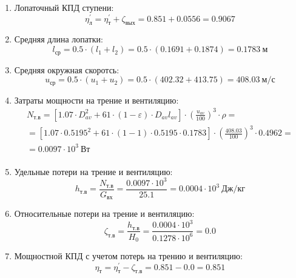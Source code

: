 \documentclass[a4paper,10pt]{article}
\begin{document}
\begin{enumerate}
        \item Лопаточный КПД ступени:
        \[
            \eta_л^\prime = \eta_т^\prime + \zeta_{вых} =
                 0.851 +  0.0556 =
            0.9067
        \]

        \item Средняя длина лопатки:
        \[
            l_{ср} = 0.5 \cdot (l_1 + l_2) =
                0.5 \cdot (0.1691 + 0.1874) =
            0.1783\ м
        \]

        \item Средняя окружная скоротсь:
        \[
            u_{ср} = 0.5 \cdot (u_1 + u_2) =
                0.5 \cdot (402.32 + 413.75) =
            408.03\ м/с
        \]

        \item Затраты мощности на трение и вентиляцию:
        \begin{gather*}
            N_{т.в} = \left[
                    1.07 \cdot D_{av}^2 + 61 \cdot (1 - \varepsilon) \cdot D_{av} l_{av}
            \right] \cdot
            \left(
                \frac{ u_{av} }{ 100 }
            \right) ^ 3 \cdot
            \rho =\\
            = \left[
                1.07 \cdot 0.5195^2 +
                61 \cdot (1 - 1) \cdot
                0.5195 \cdot 0.1783
            \right] \cdot
            \left(
                \frac{ 408.03 }{ 100 }
            \right) ^ 3 \cdot
            0.4962=\\
            = 0.0097 \cdot 10^3 \ Вт \\
        \end{gather*}

        \item Удельные потери на трение и вентиляцию:
        \[
            h_{т.в} = \frac{ N_{т.в} }{ G_{вх} } =
                \frac{
                    0.0097 \cdot 10^3
                }{
                    25.1
                }
            = 0.0004 \cdot 10^3 \ Дж/кг
        \]

        \item Относительные потери на трение и вентиляцию:
        \[
            \zeta_{т.в} = \frac{ h_{т.в} }{ H_0 } =
                \frac{ 0.0004 \cdot 10^3 }{ 0.1278 \cdot 10^6 } =
            0.0
        \]

        \item Мощностной КПД с учетом потерь на трению и вентиляцию:
        \[
            \eta_т = \eta_т^\prime - \zeta_{т.в} =
                0.851 - 0.0 =
            0.851
        \]


\end{enumerate}
\end{document}
